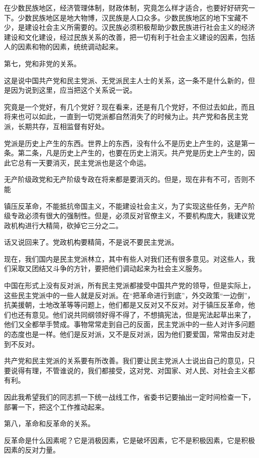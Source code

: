 在少数民族地区，经济管理体制，财政体制，究竟怎么样才适合，也要好好研究一下。少数民族地区是地大物博，汉民族是人口众多。少数民族地区的地下宝藏不少，是建设社会主义所需要的。汉民族必须积极帮助少数民族进行社会主义的经济建设和文化建设，经过民族关系的改善，把一切有利于社会主义建设的因素，包括人的因素和物的因素，统统调动起来。

第七，党和非党的关系。

这是说中国共产党和民主党派、无党派民主人士的关系，这一条不是什么新的，但是因为说到这里，应当把这个关系说一说。

究竟是一个党好，有几个党好？现在看来，还是有几个党好，不但过去如此，而且将来也可以如此，一直到一切党派都自然消失了的时候为止。共产党和各民主党派，长期共存，互相监督有好处。

党派是历史上产生的东西。世界上的东西，没有什么不是历史上产生的，这是第一条。第二条，凡是历史上产生的，也要在历史上消灭。共产党是历史上产生的，因此它总有一天要消灭，民主党派也是这个命运。

无产阶级政党和无产阶级专政在将来都是要消灭的。但是，现在非有不可，否则不能

镇压反革命，不能抵抗帝国主义，不能建设社会主义，为了实现这些任务，无产阶级专政必须有很大的强制性。但是，必须反对官僚主义，不要机构庞大，我建议党政机构进行大精简，砍掉它三分之二。

话又说回来了。党政机构要精简，不是说不要民主党派。

现在，我们国内是民主党派林立，其中有些人对我们还有很多意见。对这些人，我们采取又团结又斗争的方针，要把他们调动起来为社会主义服务。

中国在形式上没有反对派，所有民主党派都接受中国共产党的领导，但是实际上，这些民主党派中的一些人就是反对派。在“把革命进行到底”，外交政策“一边倒”，抗美援朝，士地改革等等问题上，他们都是又反对又不反对。对于镇压反革命，他们也还有意见。他们说共同纲领好得不得了，不想搞宪法，但是宪法起草出来了，他们又全都举手赞成。事物常常走到自己的反面，民主党派中的一些人对许多问题的态度也是一样。他们是反对派，又不是反对派，因为他们要爱国，常常由反对走到不反对。

共产党和民主党派的关系要有所改善。我们要让民主党派人士说出自己的意见，只要说得有理，不管谁说的，我们都接受，这对党、对国家、对人民、对社会主义都有利。

因此我希望我们的同志抓一下统一战线工作，省委书记要抽出一定时间检查一下，部署一下，把这个工作推动起来。

第八，革命和反革命的关系。

反革命是什么因素呢？它是消极因素，它是破坏因素，它不是积极因素，它是积极因素的反对力量。

